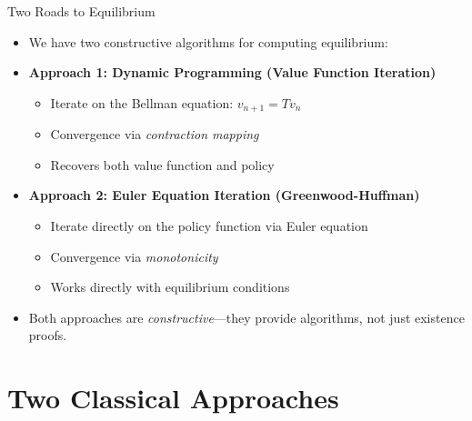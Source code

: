 \begin{frame}{Two Roads to Equilibrium}
\begin{itemize}
\item We have two constructive algorithms for computing equilibrium:

\bigskip
\item \textbf{Approach 1: Dynamic Programming (Value Function Iteration)}
\begin{itemize}
    \item Iterate on the Bellman equation: $v_{n+1} = Tv_n$
    \item Convergence via \emph{contraction mapping}
    \item Recovers both value function and policy
\end{itemize}

\bigskip
\item \textbf{Approach 2: Euler Equation Iteration (Greenwood-Huffman)}
\begin{itemize}
    \item Iterate directly on the policy function via Euler equation
    \item Convergence via \emph{monotonicity}
    \item Works directly with equilibrium conditions
\end{itemize}

\bigskip
\item Both approaches are \emph{constructive}---they provide algorithms, not just existence proofs.
\end{itemize}
\end{frame}

\section{Two Classical Approaches}

